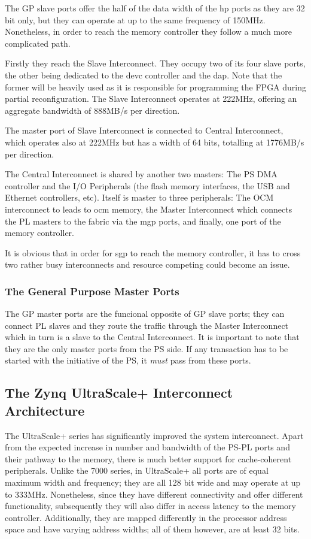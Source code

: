 The GP slave ports offer the half of the data width 
of the \gls{hp} ports as they are 32 bit only,
but they can operate at up to the same frequency of 150MHz. 
Nonetheless, in order to reach the memory controller 
they follow a much more complicated path.

Firstly they reach the Slave Interconnect. 
They occupy two of its four slave ports,
the other being dedicated to the 
\gls{devc} controller and the \gls{dap}.
Note that the former will be heavily used as it is responsible
for programming the FPGA during partial reconfiguration.
The Slave Interconnect operates at 222MHz, 
offering an aggregate bandwidth of 888MB/s per direction.

The master port of Slave Interconnect is connected to
Central Interconnect, which operates also at 222MHz but
has a width of 64 bits, totalling at 1776MB/s per direction.

The Central Interconnect is shared by another two masters:
The PS DMA controller and the I/O Peripherals
(the flash memory interfaces, the USB and Ethernet controllers, etc).
Itself is master to three peripherals:
The OCM interconnect to leads to \gls{ocm} memory, the Master Interconnect
which connects the PL masters to the \gls{fabric} via the \gls{mgp} ports,
and finally, one port of the memory controller.

It is obvious that in order for \gls{sgp} to reach the memory controller,
it has to cross two rather busy interconnects and resource competing
could become an issue.

\subsubsection{The General Purpose Master Ports}

The GP master ports are the funcional opposite of GP slave ports;
they can connect PL slaves and they route the traffic through the
Master Interconnect which in turn is a slave to the Central Interconnect.
It is important to note that they are the only master ports from the PS side.
If any transaction has to be started with the initiative of the PS,
it \emph{must} pass from these ports.

\subsection{The Zynq UltraScale+ Interconnect Architecture}

The UltraScale+ series has significantly improved the system interconnect.
Apart from the expected increase in number and bandwidth of the
PS-PL ports and their pathway to the memory, there is much better support
for cache-coherent peripherals. 
Unlike the 7000 series, in UltraScale+ 
all ports are of equal maximum width and frequency; 
they are all 128 bit wide and may operate at up to 333MHz.
Nonetheless, since they have different connectivity and offer different
functionality, subsequently they will also differ in access latency to
the memory controller. Additionally, they are mapped differently in the
processor address space and have varying address widths; all of them
however, are at least 32 bits.

